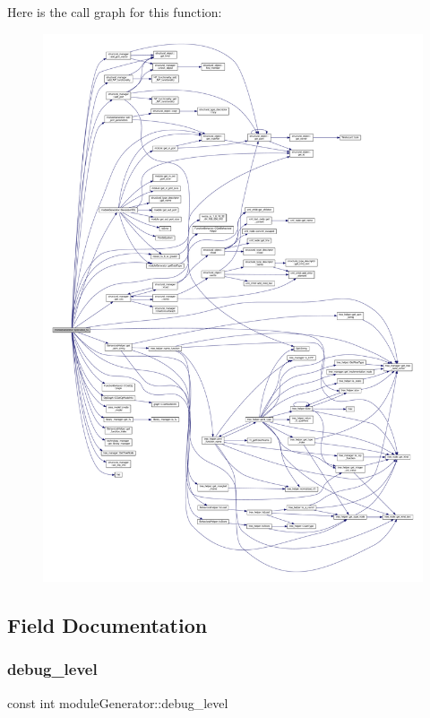 Here is the call graph for this function\+:
\nopagebreak
\begin{figure}[H]
\begin{center}
\leavevmode
\includegraphics[width=350pt]{d4/d94/classmoduleGenerator_a19de634fa61dcfbced40c67c1eb73027_cgraph}
\end{center}
\end{figure}


\subsection{Field Documentation}
\mbox{\label{classmoduleGenerator_af3225c9b4913dc30c4d887d35ff11d0c}} 
\subsubsection{\texorpdfstring{debug\+\_\+level}{debug\_level}}
{\footnotesize\ttfamily const int module\+Generator\+::debug\+\_\+level\hspace{0.3cm}{\ttfamily [protected]}}



